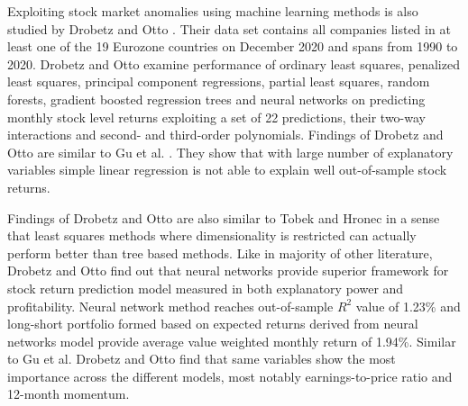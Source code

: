 \documentclass{article}
\begin{document}

Exploiting stock market anomalies using machine learning methods is also studied by Drobetz and Otto \citeyear{Drobetz}. Their data set contains all companies listed in at least one of the 19 Eurozone countries on December 2020 and spans from 1990 to 2020\footnotemark. Drobetz and Otto examine performance of ordinary least squares, penalized least squares, principal component regressions, partial least squares, random forests, gradient boosted regression trees and neural networks on predicting monthly stock level returns exploiting a set of 22 predictions, their two-way interactions and second- and third-order polynomials. Findings of Drobetz and Otto are similar to Gu et al. \citeyear{guetal}. They show that with large number of explanatory variables simple linear regression is not able to explain well out-of-sample stock returns. \par


Findings of Drobetz and Otto \citeyear{Drobetz} are also similar to Tobek and Hronec \citeyear{TOBEK2021100588} in a sense that least squares methods where dimensionality is restricted can actually perform better than tree based methods. Like in majority of other literature, Drobetz and Otto find out that neural networks provide superior framework for stock return prediction model measured in both explanatory power and profitability. Neural network method reaches out-of-sample $R^{2}$ value of 1.23\% and long-short portfolio formed based on expected returns derived from neural networks model provide average value weighted monthly return of 1.94\%. Similar to Gu et al. \citeyear{guetal} Drobetz and Otto find that same variables show the most importance across the different models, most notably earnings-to-price ratio and 12-month momentum. \par
\end{document}
